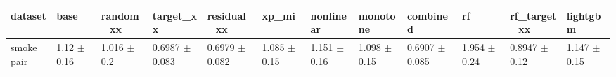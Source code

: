 \begin{tabular}{llllllllllll}
\toprule
dataset & base & random\_xx & target\_xx & residual\_xx & xp\_mi & nonlinear & monotone & combined & rf & rf\_target\_xx & lightgbm \\
\midrule
smoke\_pair & 1.12 $\pm$ 0.16 & 1.016 $\pm$ 0.2 & 0.6987 $\pm$ 0.083 & 0.6979 $\pm$ 0.082 & 1.085 $\pm$ 0.15 & 1.151 $\pm$ 0.16 & 1.098 $\pm$ 0.15 & 0.6907 $\pm$ 0.085 & 1.954 $\pm$ 0.24 & 0.8947 $\pm$ 0.12 & 1.147 $\pm$ 0.15 \\
\bottomrule
\end{tabular}

